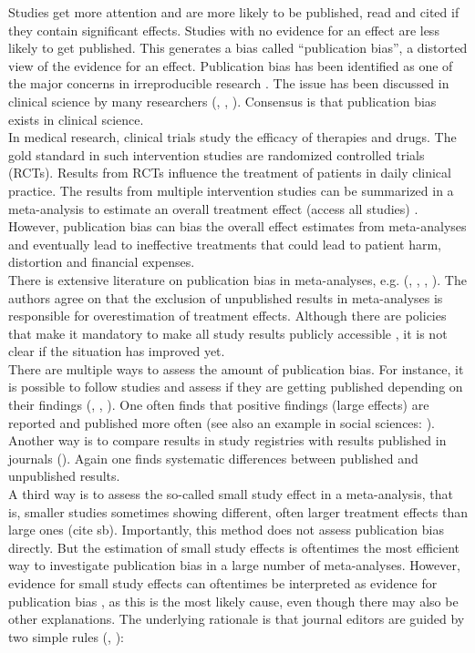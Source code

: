 \documentclass[11pt,a4paper,twoside]{book}\usepackage[]{graphicx}\usepackage[]{color}
\begin{document}
Studies get more attention and are more likely to be published, read and cited if they contain significant effects. Studies with no evidence for an effect are less likely to get published. This generates a bias called ``publication bias'', a distorted view of the evidence for an effect. Publication bias has been identified as one of the major concerns in irreproducible research \citep{Bishop.2019}. The issue has been discussed in clinical science by many researchers (\citet{pb.clinicalscience1}, \citet{sterne2001}, \citet{Dwan2013}). Consensus is that publication bias exists in clinical science. \\
In medical research, clinical trials study the efficacy of therapies and drugs. The gold standard in such intervention studies are randomized controlled trials (RCTs). Results from RCTs influence the treatment of patients in daily clinical practice. The results from multiple intervention studies can be summarized in a meta-analysis to estimate an overall treatment effect (access all studies) \citep{Cochran}. However, publication bias can bias the overall effect estimates from meta-analyses and eventually lead to ineffective treatments that could lead to patient harm, distortion and financial expenses. \\
There is extensive literature on publication bias in meta-analyses, e.g. (\citet{pb.clinicalscience.2013}, %
\citet{grey.literature.4}, \citet{grey.literature.3}, \citet{grey.literature.2}).
The authors agree on that the exclusion of unpublished results in meta-analyses is responsible for overestimation of treatment effects. Although there are policies that make it mandatory to make all study results publicly accessible \citep{fda}, it is not clear if the situation has improved yet.\\
There are multiple ways to assess the amount of publication bias. For instance, it is possible to follow studies and assess if they are getting published depending on their findings (\citet{Dwan2013}, \citet{publication.fate}, \citet{Lee.2008}). One often finds that positive findings (\ie large effects) are reported and published more often (see also an example in social sciences: \citet{social.sciences.publication.bias}). Another way is to compare results in study registries with results published in journals (\eg \citet{pb.clinicalscience.2013}). Again one finds systematic differences between published and unpublished results. \\
A third way is to assess the so-called small study effect in a meta-analysis, that is, smaller studies sometimes showing different, often larger treatment effects than large ones (cite sb). Importantly, this method does not assess publication bias directly. But the estimation of small study effects is oftentimes the most efficient way to investigate publication bias in a large number of meta-analyses. However, evidence for small study effects can oftentimes be interpreted as evidence for publication bias \citep{Egger}, as this is the most likely cause, even though there may also be other explanations. The underlying rationale is that journal editors are guided by two simple rules (\citet{excess.significance}, \citet{ioannidis.2019}): 
\end{document}
